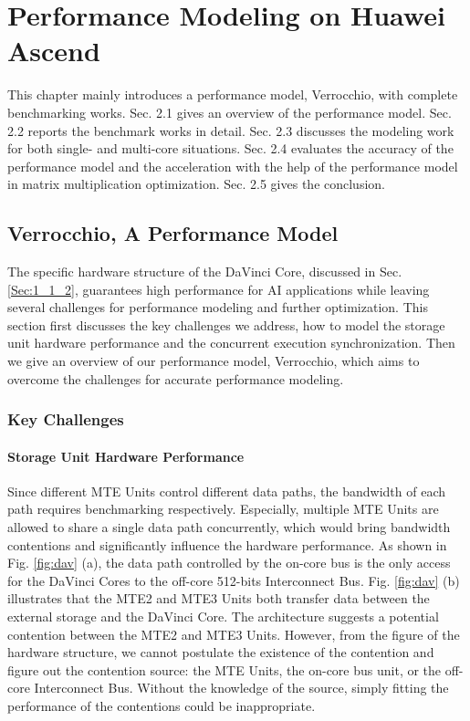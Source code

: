 \documentclass[12pt]{extbook}
\begin{document}
\chapter{Performance Modeling on Huawei Ascend}
\label{sec_2}

This chapter mainly introduces a performance model, Verrocchio, with complete benchmarking works. Sec. 2.1 gives an overview of the performance model. Sec. 2.2 reports the benchmark works in detail. Sec. 2.3 discusses the modeling work for both single- and multi-core situations. Sec. 2.4 evaluates the accuracy of the performance model and the acceleration with the help of the performance model in matrix multiplication optimization. Sec. 2.5 gives the conclusion.

\section{Verrocchio, A Performance Model}
\label{sec_2_1}

The specific hardware structure of the DaVinci Core, discussed in Sec. \ref{Sec:1_1_2}, guarantees high performance for AI applications while leaving several challenges for performance modeling and further optimization. This section first discusses the key challenges we address, how to model the storage unit hardware performance and the concurrent execution synchronization. Then we give an overview of our performance model, Verrocchio, which aims to overcome the challenges for accurate performance modeling.

\subsection{Key Challenges}

\subsubsection{Storage Unit Hardware Performance}

Since different MTE Units control different data paths, the bandwidth of each path requires benchmarking respectively. Especially, multiple MTE Units are allowed to share a single data path concurrently, which would bring bandwidth contentions and significantly influence the hardware performance. As shown in Fig. \ref{fig:dav} (a), the data path controlled by the on-core bus is the only access for the DaVinci Cores to the off-core 512-bits Interconnect Bus. Fig. \ref{fig:dav} (b) illustrates that the MTE2 and MTE3 Units both transfer data between the external storage and the DaVinci Core. The architecture suggests a potential contention between the MTE2 and MTE3 Units. However, from the figure of the hardware structure, we cannot postulate the existence of the contention and figure out the contention source: the MTE Units, the on-core bus unit, or the off-core Interconnect Bus. Without the knowledge of the source, simply fitting the performance of the contentions could be inappropriate.
\end{document}
